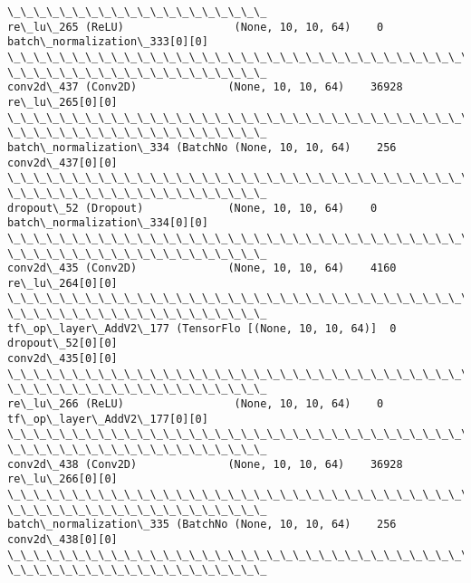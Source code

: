 \documentclass[11pt]{article}
\begin{document}
\begin{Verbatim}[commandchars=\\\{\}]
\_\_\_\_\_\_\_\_\_\_\_\_\_\_\_\_\_\_\_\_
re\_lu\_265 (ReLU)                 (None, 10, 10, 64)    0
batch\_normalization\_333[0][0]
\_\_\_\_\_\_\_\_\_\_\_\_\_\_\_\_\_\_\_\_\_\_\_\_\_\_\_\_\_\_\_\_\_\_\_\_\_\_\_\_\_\_\_\_\_\_\_\_\_\_\_\_\_\_\_\_\_\_\_\_\_\_\_\_\_\_\_\_\_\_\_\_\_\_\_\_\_\_\_\_
\_\_\_\_\_\_\_\_\_\_\_\_\_\_\_\_\_\_\_\_
conv2d\_437 (Conv2D)              (None, 10, 10, 64)    36928
re\_lu\_265[0][0]
\_\_\_\_\_\_\_\_\_\_\_\_\_\_\_\_\_\_\_\_\_\_\_\_\_\_\_\_\_\_\_\_\_\_\_\_\_\_\_\_\_\_\_\_\_\_\_\_\_\_\_\_\_\_\_\_\_\_\_\_\_\_\_\_\_\_\_\_\_\_\_\_\_\_\_\_\_\_\_\_
\_\_\_\_\_\_\_\_\_\_\_\_\_\_\_\_\_\_\_\_
batch\_normalization\_334 (BatchNo (None, 10, 10, 64)    256
conv2d\_437[0][0]
\_\_\_\_\_\_\_\_\_\_\_\_\_\_\_\_\_\_\_\_\_\_\_\_\_\_\_\_\_\_\_\_\_\_\_\_\_\_\_\_\_\_\_\_\_\_\_\_\_\_\_\_\_\_\_\_\_\_\_\_\_\_\_\_\_\_\_\_\_\_\_\_\_\_\_\_\_\_\_\_
\_\_\_\_\_\_\_\_\_\_\_\_\_\_\_\_\_\_\_\_
dropout\_52 (Dropout)             (None, 10, 10, 64)    0
batch\_normalization\_334[0][0]
\_\_\_\_\_\_\_\_\_\_\_\_\_\_\_\_\_\_\_\_\_\_\_\_\_\_\_\_\_\_\_\_\_\_\_\_\_\_\_\_\_\_\_\_\_\_\_\_\_\_\_\_\_\_\_\_\_\_\_\_\_\_\_\_\_\_\_\_\_\_\_\_\_\_\_\_\_\_\_\_
\_\_\_\_\_\_\_\_\_\_\_\_\_\_\_\_\_\_\_\_
conv2d\_435 (Conv2D)              (None, 10, 10, 64)    4160
re\_lu\_264[0][0]
\_\_\_\_\_\_\_\_\_\_\_\_\_\_\_\_\_\_\_\_\_\_\_\_\_\_\_\_\_\_\_\_\_\_\_\_\_\_\_\_\_\_\_\_\_\_\_\_\_\_\_\_\_\_\_\_\_\_\_\_\_\_\_\_\_\_\_\_\_\_\_\_\_\_\_\_\_\_\_\_
\_\_\_\_\_\_\_\_\_\_\_\_\_\_\_\_\_\_\_\_
tf\_op\_layer\_AddV2\_177 (TensorFlo [(None, 10, 10, 64)]  0
dropout\_52[0][0]
conv2d\_435[0][0]
\_\_\_\_\_\_\_\_\_\_\_\_\_\_\_\_\_\_\_\_\_\_\_\_\_\_\_\_\_\_\_\_\_\_\_\_\_\_\_\_\_\_\_\_\_\_\_\_\_\_\_\_\_\_\_\_\_\_\_\_\_\_\_\_\_\_\_\_\_\_\_\_\_\_\_\_\_\_\_\_
\_\_\_\_\_\_\_\_\_\_\_\_\_\_\_\_\_\_\_\_
re\_lu\_266 (ReLU)                 (None, 10, 10, 64)    0
tf\_op\_layer\_AddV2\_177[0][0]
\_\_\_\_\_\_\_\_\_\_\_\_\_\_\_\_\_\_\_\_\_\_\_\_\_\_\_\_\_\_\_\_\_\_\_\_\_\_\_\_\_\_\_\_\_\_\_\_\_\_\_\_\_\_\_\_\_\_\_\_\_\_\_\_\_\_\_\_\_\_\_\_\_\_\_\_\_\_\_\_
\_\_\_\_\_\_\_\_\_\_\_\_\_\_\_\_\_\_\_\_
conv2d\_438 (Conv2D)              (None, 10, 10, 64)    36928
re\_lu\_266[0][0]
\_\_\_\_\_\_\_\_\_\_\_\_\_\_\_\_\_\_\_\_\_\_\_\_\_\_\_\_\_\_\_\_\_\_\_\_\_\_\_\_\_\_\_\_\_\_\_\_\_\_\_\_\_\_\_\_\_\_\_\_\_\_\_\_\_\_\_\_\_\_\_\_\_\_\_\_\_\_\_\_
\_\_\_\_\_\_\_\_\_\_\_\_\_\_\_\_\_\_\_\_
batch\_normalization\_335 (BatchNo (None, 10, 10, 64)    256
conv2d\_438[0][0]
\_\_\_\_\_\_\_\_\_\_\_\_\_\_\_\_\_\_\_\_\_\_\_\_\_\_\_\_\_\_\_\_\_\_\_\_\_\_\_\_\_\_\_\_\_\_\_\_\_\_\_\_\_\_\_\_\_\_\_\_\_\_\_\_\_\_\_\_\_\_\_\_\_\_\_\_\_\_\_\_
\_\_\_\_\_\_\_\_\_\_\_\_\_\_\_\_\_\_\_\_

\end{Verbatim}
\end{document}
